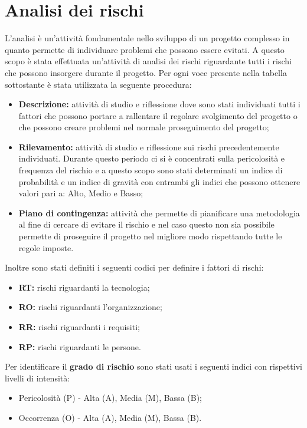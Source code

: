 \section{Analisi dei rischi}
L'analisi è un'attività fondamentale nello sviluppo di un progetto complesso in quanto permette di individuare problemi che possono essere evitati.
A questo scopo è stata effettuata un'attività di analisi dei rischi riguardante tutti i rischi che possono insorgere durante il progetto.
Per ogni voce presente nella tabella sottostante è stata utilizzata la seguente procedura:
\begin{itemize}
	\item \textbf{Descrizione:} attività di studio e riflessione dove sono stati individuati tutti i fattori che possono portare a rallentare il regolare svolgimento del progetto o che possono creare problemi nel normale proseguimento del progetto; \\
	\item \textbf{Rilevamento:} attività di studio e riflessione sui rischi precedentemente individuati. Durante questo periodo ci si è concentrati sulla pericolosità e frequenza del rischio e a questo scopo sono stati determinati un indice di probabilità e un indice di gravità con entrambi gli indici che possono ottenere valori pari a: Alto, Medio e Basso; \\
	\item \textbf{Piano di contingenza:} attività che permette di pianificare una metodologia al fine di cercare di evitare il rischio e nel caso questo non sia possibile permette di proseguire il progetto nel migliore modo rispettando tutte le regole imposte. \\
\end{itemize}
Inoltre sono stati definiti i seguenti codici per definire i fattori di rischi:
\begin{itemize}
	\item \textbf{RT:} rischi riguardanti la tecnologia;
	\item \textbf{RO:} rischi riguardanti l'organizzazione;
	\item \textbf{RR:} rischi riguardanti i requisiti;
	\item \textbf{RP:} rischi riguardanti le persone.
\end{itemize}
Per identificare il \textbf{grado di rischio} sono stati usati i seguenti indici con rispettivi livelli di intensità:
\begin{itemize}
	\item Pericolosità (P) - Alta (A), Media (M), Bassa (B);
	\item Occorrenza (O) - Alta (A), Media (M), Bassa (B).
\end{itemize}

